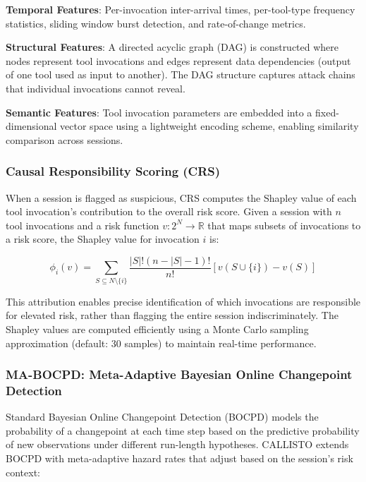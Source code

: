 \documentclass[10pt,conference]{IEEEtran}
\begin{document}
\textbf{Temporal Features}: Per-invocation inter-arrival times, per-tool-type frequency statistics, sliding window burst detection, and rate-of-change metrics.

\textbf{Structural Features}: A directed acyclic graph (DAG) is constructed where nodes represent tool invocations and edges represent data dependencies (output of one tool used as input to another). The DAG structure captures attack chains that individual invocations cannot reveal.

\textbf{Semantic Features}: Tool invocation parameters are embedded into a fixed-dimensional vector space using a lightweight encoding scheme, enabling similarity comparison across sessions.

\subsubsection{Causal Responsibility Scoring (CRS)}

When a session is flagged as suspicious, CRS computes the Shapley value of each tool invocation's contribution to the overall risk score. Given a session with $n$ tool invocations and a risk function $v: 2^N \rightarrow \mathbb{R}$ that maps subsets of invocations to a risk score, the Shapley value for invocation $i$ is:

\begin{equation}
\phi_i(v) = \sum_{S \subseteq N \setminus \{i\}} \frac{|S|! (n - |S| - 1)!}{n!} \left[v(S \cup \{i\}) - v(S)\right]
\end{equation}

This attribution enables precise identification of which invocations are responsible for elevated risk, rather than flagging the entire session indiscriminately. The Shapley values are computed efficiently using a Monte Carlo sampling approximation (default: 30 samples) to maintain real-time performance.

\subsubsection{MA-BOCPD: Meta-Adaptive Bayesian Online Changepoint Detection}

Standard Bayesian Online Changepoint Detection (BOCPD) models the probability of a changepoint at each time step based on the predictive probability of new observations under different run-length hypotheses. CALLISTO extends BOCPD with meta-adaptive hazard rates that adjust based on the session's risk context:
\end{document}
